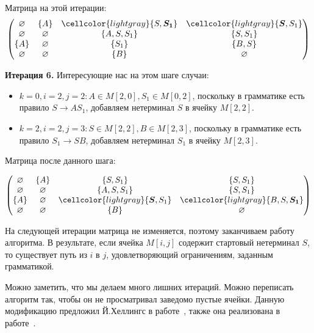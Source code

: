 \begin{example}
Матрица на этой итерации:
\[
\begin{pmatrix}
\varnothing & \{A\}       & \cellcolor{lightgray}\{S, \boldsymbol{S_1}\}    & \cellcolor{lightgray}\{\boldsymbol{S}, S_1\}  \\
\varnothing & \varnothing & \{A, S, S_1\} & \{S, S_1\}  \\
\{A\}       & \varnothing & \{S_1\}       & \{B, S\}    \\
\varnothing & \varnothing & \{B\}         & \varnothing \\
\end{pmatrix}
\]

\textbf{Итерация 6.}
Интересующие нас на этом шаге случаи:

\begin{itemize}
    \setlength\itemsep{1em}
    \item $k = 0, i = 2, j = 2: A \in M[2, 0], S_1 \in M[0, 2]$, поскольку в грамматике есть правило $S \to A S_1$, добавляем нетерминал $S$ в ячейку $M[2, 2]$.
    \item $k = 2, i = 2, j = 3: S \in M[2, 2], B \in M[2, 3]$, поскольку в грамматике есть правило $S_1 \to S B$, добавляем нетерминал $S_1$ в ячейку $M[2, 3]$.
\end{itemize}

Матрица после данного шага:

\[
\begin{pmatrix}
\varnothing & \{A\}       & \{S, S_1\}    & \{S, S_1\}    \\
\varnothing & \varnothing & \{A, S, S_1\} & \{S, S_1\}    \\
\{A\}       & \varnothing & \cellcolor{lightgray}\{\boldsymbol{S}, S_1\}    & \cellcolor{lightgray}\{B, S, \boldsymbol{S_1}\} \\
\varnothing & \varnothing & \{B\}         & \varnothing   \\
\end{pmatrix}
\]

На следующей итерации матрица не изменяется, поэтому заканчиваем работу алгоритма. В результате, если ячейка $M[i, j]$ содержит стартовый нетерминал $S$, то существует путь из $i$ в $j$, удовлетворяющий ограничениям, заданным грамматикой.
\end{example}

Можно заметить, что мы делаем много лишних итераций.
Можно переписать алгоритм так, чтобы он не просматривал заведомо пустые ячейки.
Данную модификацию предложил Й.Хеллингс в работе~\cite{hellingsRelational}, также она реализована в работе~\cite{10.1007/978-3-319-46523-4_38}.

